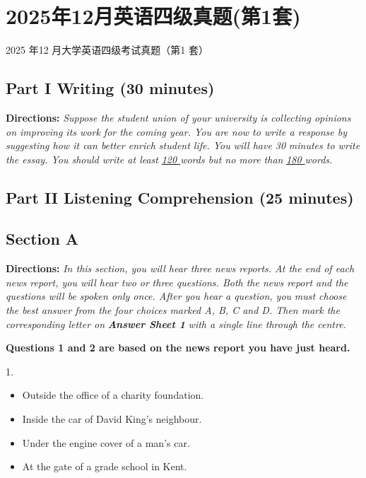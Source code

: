 \documentclass[UTF8,11pt]{ctexart}
\begin{document}
\section*{2025年12月英语四级真题(第1套)}
2025 年12 月大学英语四级考试真题（第1 套）


\subsection*{\textbf{Part I Writing} \textbf{(30 minutes)}}


\textbf{Directions:} \textit{Suppose the student union of your university is collecting opinions on improving its work for the} \textit{coming year. You are now to write a response by suggesting how it can better enrich student life. You will have 30} \textit{minutes to write the essay. You should write at least }\textit{\uline{120 }}\textit{words but no more than }\textit{\uline{180 }}\textit{words.}


\subsection*{\textbf{Part II} \textbf{Listening Comprehension} \textbf{(25 minutes)}}


\subsection*{\textbf{Section A}}


\textbf{Directions:} \textit{In this section, you will hear three news reports. At the end of each news report, you will hear two or} \textit{three questions. Both the news report and the questions will be spoken only once. After you hear a question, you} \textit{must choose the best answer from the four choices marked A, B, C and D. Then mark the corresponding letter on} \textbf{\textit{Answer Sheet 1}}\textit{ with a single line through the centre.}


\textbf{Questions 1 and 2 are based on the news report you have just heard.}


1.


\begin{itemize}[leftmargin=2em,itemsep=.2em,topsep=.4em]\item[A.] Outside the office of a charity foundation.
\item[B.] Inside the car of David King’s neighbour.
\item[C.] Under the engine cover of a man’s car.
\item[D.] At the gate of a grade school in Kent.
\end{itemize}
\end{document}
